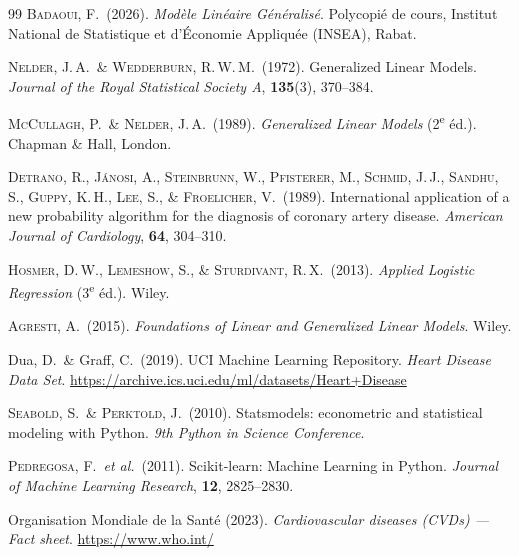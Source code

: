 \documentclass[11pt,a4paper,twoside]{report}
\theoremstyle{definition}
\begin{document}
\begin{thebibliography}{99}
  \textsc{Badaoui}, F.\ (2026).
  \emph{Modèle Linéaire Généralisé}. Polycopié de cours,
  Institut National de Statistique et d'Économie Appliquée (INSEA),
  Rabat.

  \textsc{Nelder}, J.\,A.\ \& \textsc{Wedderburn}, R.\,W.\,M.\ (1972).
  Generalized Linear Models. \emph{Journal of the Royal Statistical
  Society A}, \textbf{135}(3), 370--384.

  \textsc{McCullagh}, P.\ \& \textsc{Nelder}, J.\,A.\ (1989).
  \emph{Generalized Linear Models} (2\textsuperscript{e} éd.).
  Chapman \& Hall, London.

  \textsc{Detrano}, R., \textsc{Jánosi}, A., \textsc{Steinbrunn}, W.,
  \textsc{Pfisterer}, M., \textsc{Schmid}, J.\,J., \textsc{Sandhu},
  S., \textsc{Guppy}, K.\,H., \textsc{Lee}, S., \&
  \textsc{Froelicher}, V.\ (1989).
  International application of a new probability algorithm for the
  diagnosis of coronary artery disease.
  \emph{American Journal of Cardiology}, \textbf{64}, 304--310.

  \textsc{Hosmer}, D.\,W., \textsc{Lemeshow}, S., \&
  \textsc{Sturdivant}, R.\,X.\ (2013).
  \emph{Applied Logistic Regression} (3\textsuperscript{e} éd.). Wiley.

  \textsc{Agresti}, A.\ (2015).
  \emph{Foundations of Linear and Generalized Linear Models}. Wiley.

  Dua, D.\ \& Graff, C.\ (2019).
  UCI Machine Learning Repository. \emph{Heart Disease Data Set}.
  \url{https://archive.ics.uci.edu/ml/datasets/Heart+Disease}

  \textsc{Seabold}, S.\ \& \textsc{Perktold}, J.\ (2010).
  Statsmodels: econometric and statistical modeling with Python.
  \emph{9th Python in Science Conference}.

  \textsc{Pedregosa}, F.\ \textit{et al.}\ (2011).
  Scikit-learn: Machine Learning in Python.
  \emph{Journal of Machine Learning Research}, \textbf{12}, 2825--2830.

  Organisation Mondiale de la Santé (2023).
  \emph{Cardiovascular diseases (CVDs) --- Fact sheet}.
  \url{https://www.who.int/}
\end{thebibliography}
\end{document}
